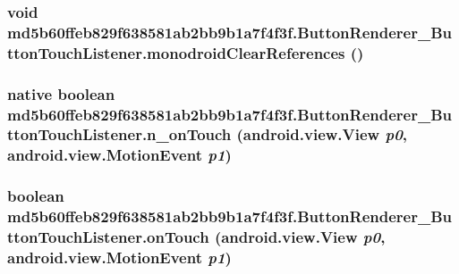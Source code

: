 \hypertarget{classmd5b60ffeb829f638581ab2bb9b1a7f4f3f_1_1_button_renderer___button_touch_listener_91150dd8f1d697f0ed9ee864c201bc56}{
\subsubsection[{monodroidClearReferences}]{\setlength{\rightskip}{0pt plus 5cm}void md5b60ffeb829f638581ab2bb9b1a7f4f3f.ButtonRenderer\_\-ButtonTouchListener.monodroidClearReferences ()}}
\label{classmd5b60ffeb829f638581ab2bb9b1a7f4f3f_1_1_button_renderer___button_touch_listener_91150dd8f1d697f0ed9ee864c201bc56}


\hypertarget{classmd5b60ffeb829f638581ab2bb9b1a7f4f3f_1_1_button_renderer___button_touch_listener_8cfa93947f06e817f218196291038bc1}{
\subsubsection[{n\_\-onTouch}]{\setlength{\rightskip}{0pt plus 5cm}native boolean md5b60ffeb829f638581ab2bb9b1a7f4f3f.ButtonRenderer\_\-ButtonTouchListener.n\_\-onTouch (android.view.View {\em p0}, \/  android.view.MotionEvent {\em p1})}}
\label{classmd5b60ffeb829f638581ab2bb9b1a7f4f3f_1_1_button_renderer___button_touch_listener_8cfa93947f06e817f218196291038bc1}


\hypertarget{classmd5b60ffeb829f638581ab2bb9b1a7f4f3f_1_1_button_renderer___button_touch_listener_3fce128bd937b47b24703f5215265222}{
\subsubsection[{onTouch}]{\setlength{\rightskip}{0pt plus 5cm}boolean md5b60ffeb829f638581ab2bb9b1a7f4f3f.ButtonRenderer\_\-ButtonTouchListener.onTouch (android.view.View {\em p0}, \/  android.view.MotionEvent {\em p1})}}
\label{classmd5b60ffeb829f638581ab2bb9b1a7f4f3f_1_1_button_renderer___button_touch_listener_3fce128bd937b47b24703f5215265222}




